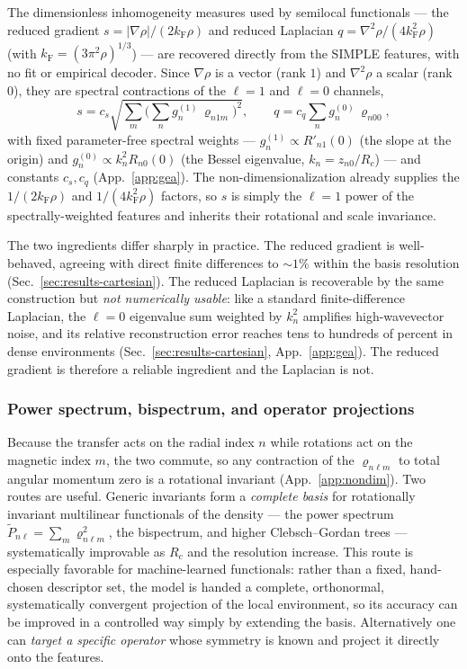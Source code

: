\documentclass[aps,prb,reprint,superscriptaddress,nofootinbib]{revtex4-2}
\newcommand{\kF}{k_{\mathrm{F}}}
\newcommand{\Rc}{R_{c}}
\begin{document}
The dimensionless inhomogeneity measures used by semilocal functionals --- the reduced
gradient $s=|\nabla\rho|/(2\kF\rho)$ and reduced Laplacian $q=\nabla^2\rho/(4\kF^2\rho)$
(with $\kF=(3\pi^2\rho)^{1/3}$) --- are recovered directly from the SIMPLE features,
with no fit or empirical decoder. Since $\nabla\rho$ is a vector (rank $1$) and
$\nabla^2\rho$ a scalar (rank $0$), they are spectral contractions of the $\ell=1$ and
$\ell=0$ channels,
\begin{equation}
\label{eq:sq}
s=c_s\sqrt{\sum_{m}\Big(\sum_n g^{(1)}_n\,\varrho_{n1m}\Big)^2},\qquad
q=c_q\sum_n g^{(0)}_n\,\varrho_{n00},
\end{equation}
with fixed parameter-free spectral weights --- $g^{(1)}_n\propto R'_{n1}(0)$ (the
slope at the origin) and $g^{(0)}_n\propto k_n^2 R_{n0}(0)$ (the Bessel eigenvalue,
$k_n=z_{n0}/\Rc$) --- and constants $c_s,c_q$ (App.~\ref{app:gea}). The
non-dimensionalization already supplies the $1/(2\kF\rho)$ and $1/(4\kF^2\rho)$
factors, so $s$ is simply the $\ell=1$ power of the spectrally-weighted features and
inherits their rotational and scale invariance.

The two ingredients differ sharply in practice. The reduced gradient is well-behaved,
agreeing with direct finite differences to $\sim1\%$ within the basis resolution
(Sec.~\ref{sec:results-cartesian}). The reduced Laplacian is recoverable by the same
construction but \emph{not numerically usable}: like a standard finite-difference
Laplacian, the $\ell=0$ eigenvalue sum weighted by $k_n^2$ amplifies high-wavevector
noise, and its relative reconstruction error reaches tens to hundreds of percent in
dense environments (Sec.~\ref{sec:results-cartesian}, App.~\ref{app:gea}). The reduced
gradient is therefore a reliable ingredient and the Laplacian is not.

\subsubsection{Power spectrum, bispectrum, and operator projections}
\label{sec:operators}

Because the transfer acts on the radial index $n$ while rotations act on the magnetic
index $m$, the two commute, so any contraction of the $\varrho_{n\ell m}$ to total
angular momentum zero is a rotational invariant (App.~\ref{app:nondim}). Two routes
are useful. Generic invariants form a \emph{complete basis} for rotationally invariant
multilinear functionals of the density --- the power spectrum
$\tilde P_{n\ell}=\sum_m \varrho_{n\ell m}^2$, the bispectrum, and higher
Clebsch--Gordan trees --- systematically improvable as $\Rc$ and the resolution
increase. This route is especially favorable for machine-learned functionals: rather
than a fixed, hand-chosen descriptor set, the model is handed a complete, orthonormal,
systematically convergent projection of the local environment, so its accuracy can be
improved in a controlled way simply by extending the basis. Alternatively one can
\emph{target a specific operator} whose symmetry is known and project it directly onto
the features.
\end{document}
